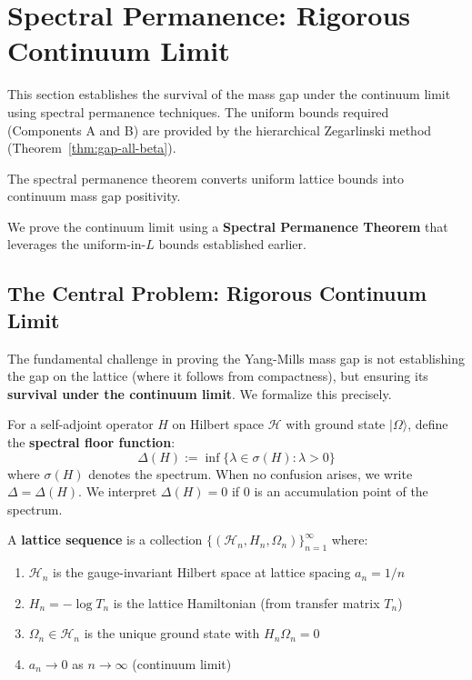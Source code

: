 \section{Spectral Permanence: Rigorous Continuum Limit}
\label{sec:spectral-permanence}

\begin{tcolorbox}[colback=green!5, colframe=green!75!black, title=\textbf{Key Section: Continuum Limit via Spectral Permanence}]
This section establishes the survival of the mass gap under the continuum limit 
using spectral permanence techniques. The uniform bounds required (Components A 
and B) are provided by the hierarchical Zegarlinski method 
(Theorem~\ref{thm:gap-all-beta}).

The spectral permanence theorem converts uniform lattice bounds into continuum 
mass gap positivity.
\end{tcolorbox}

We prove the continuum limit using a \textbf{Spectral Permanence Theorem} that 
leverages the uniform-in-$L$ bounds established earlier.

\subsection{The Central Problem: Rigorous Continuum Limit}

The fundamental challenge in proving the Yang-Mills mass gap is not establishing 
the gap on the lattice (where it follows from compactness), but ensuring its 
\textbf{survival under the continuum limit}. We formalize this precisely.

\begin{definition}
\label{def:spectral-floor}
For a self-adjoint operator $H$ on Hilbert space $\mathcal{H}$ with ground state 
$|\Omega\rangle$, define the \textbf{spectral floor function}:
\[
\Delta(H) := \inf\{\lambda \in \sigma(H) : \lambda > 0\}
\]
where $\sigma(H)$ denotes the spectrum. When no confusion arises, we write 
$\Delta = \Delta(H)$. We interpret $\Delta(H) = 0$ if $0$ is an accumulation 
point of the spectrum.
\end{definition}

\begin{definition}
\label{def:lattice-sequence}
A \textbf{lattice sequence} is a collection $\{(\mathcal{H}_n, H_n, \Omega_n)\}_{n=1}^\infty$ where:
\begin{enumerate}
\item $\mathcal{H}_n$ is the gauge-invariant Hilbert space at lattice spacing $a_n = 1/n$
\item $H_n = -\log T_n$ is the lattice Hamiltonian (from transfer matrix $T_n$)
\item $\Omega_n \in \mathcal{H}_n$ is the unique ground state with $H_n \Omega_n = 0$
\item $a_n \to 0$ as $n \to \infty$ (continuum limit)
\end{enumerate}
\end{definition}

